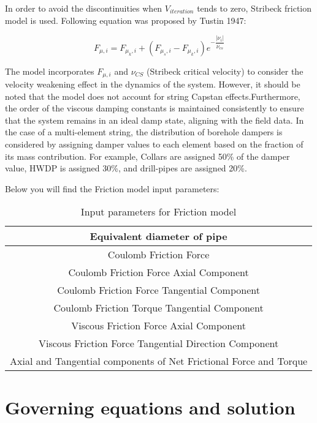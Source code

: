 In order to avoid the discontinuities when $V_{iteration}$ tends to zero, Stribeck friction model is used. Following equation was proposed by Tustin 1947:

\begin{equation}\label{Stribeck velocity}
  F_{\mu,i} = F_{\mu_{k},i} + (F_{\mu_{s},i} - F_{\mu_{k},i})e^{-\dfrac{|\nu_{i}|}{\nu_{cs}}}
\end{equation} 

The model incorporates $F_{\mu,i}$ and $\nu_{CS}$ (Stribeck critical velocity) to consider the velocity weakening effect in the dynamics of the system. However, it should be noted that the model does not account for string Capstan effects.Furthermore, the order of the viscous damping constants is maintained consistently to ensure that the system remains in an ideal damp state, aligning with the field data. In the case of a multi-element string, the distribution of borehole dampers is considered by assigning damper values to each element based on the fraction of its mass contribution. For example, Collars are assigned 50\% of the damper value, HWDP is assigned 30\%, and drill-pipes are assigned 20\%. 

Below you will find the Friction model input parameters:

\begin{table}
  \centering
  \begin{tabular}{|c|}
    \hline
    Equivalent diameter of pipe\\
    \hline
    Coulomb Friction Force \\
    \hline
    Coulomb Friction Force Axial Component \\
    \hline
    Coulomb Friction Force Tangential Component \\
    \hline
    Coulomb Friction Torque Tangential Component \\
    \hline
    Viscous Friction Force Axial Component \\
    \hline
    Viscous Friction Force Tangential Direction Component \\
    \hline
    Axial and Tangential components of Net Frictional Force and Torque \\
    \hline
  \end{tabular}
  \caption{Input parameters for Friction model}\label{Table_Friction_Input}
\end{table}

\section{Governing equations and solution}

